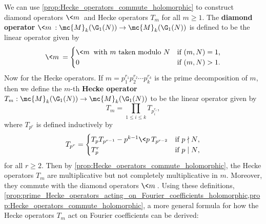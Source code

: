     We can use \cref{prop:Hecke_operators_commute_holomorphic} to construct diamond operators $\<m\>$ and Hecke operators $T_{m}$ for all $m \ge 1$. The \textbf{diamond operator} $\<m\>:\mc{M}_{k}(\G_{1}(N)) \to \mc{M}_{k}(\G_{1}(N))$ is defined to be the linear operator given by
    \[
      \<m\> = \begin{cases} \<m\> \text{ with $m$ taken modulo $N$} & \text{if $(m,N) = 1$,} \\ 0 & \text{if $(m,N) > 1$.} \end{cases}
    \]
    Now for the Hecke operators. If $m = p_{1}^{r_{1}}p_{2}^{r_{2}} \cdots p_{k}^{r_{k}}$ is the prime decomposition of $m$, then we define the $m$-th \textbf{Hecke operator} $T_{m}:\mc{M}_{k}(\G_{1}(N)) \to \mc{M}_{k}(\G_{1}(N))$ to be the linear operator given by
    \[
      T_{m} = \prod_{1 \le i \le k}T_{p_{i}^{r_{i}}},
    \]
    where $T_{p^{r}}$ is defined inductively by
    \[
      T_{p^{r}} = \begin{cases} T_{p}T_{p^{r-1}}-p^{k-1}\<p\>T_{p^{r-2}} & \text{if $p \nmid N$}, \\ T_{p}^{r} & \text{if $p \mid N$}, \end{cases}
    \]
    for all $r \ge 2$. Then by \cref{prop:Hecke_operators_commute_holomorphic}, the Hecke operators $T_{m}$ are multiplicative but not completely multiplicative in $m$. Moreover, they commute with the diamond operators $\<m\>$. Using these definitions, \cref{prop:prime_Hecke_operators_acting_on_Fourier_coefficients_holomorphic,prop:Hecke_operators_commute_holomorphic}, a more general formula for how the Hecke operators $T_{m}$ act on Fourier coefficients can be derived:

